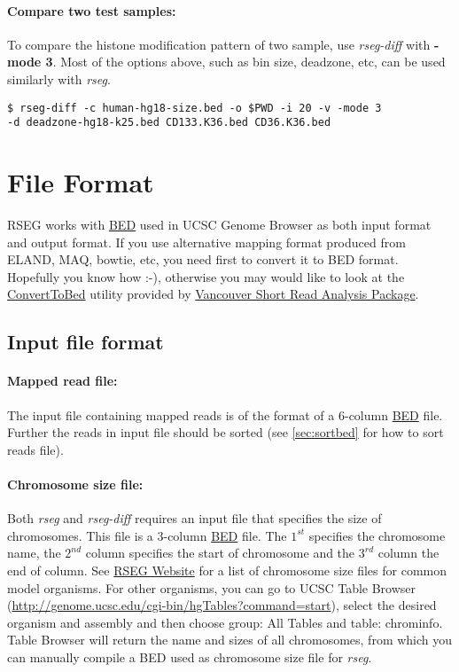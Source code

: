 \documentclass[11pt]{report}
\begin{document}
\paragraph{Compare two test samples:}
To compare the histone modification pattern of two sample, use
\textit{rseg-diff} with \textbf{-mode 3}. Most of the options above, such as bin size,
deadzone, etc, can be used similarly with \textit{rseg}.
\begin{verbatim}
$ rseg-diff -c human-hg18-size.bed -o $PWD -i 20 -v -mode 3 
-d deadzone-hg18-k25.bed CD133.K36.bed CD36.K36.bed
\end{verbatim}

\section{File Format}
\label{sec:file-format}

RSEG works with
\href{http://genome.ucsc.edu/FAQ/FAQformat.html#format1}{BED} used in
UCSC Genome Browser as both input format and output format. If you use
alternative mapping format produced from ELAND, MAQ, bowtie, etc, you
need first to convert it to BED format. Hopefully you know how :-),
otherwise you may would like to look at the
\href{http://sourceforge.net/apps/mediawiki/vancouvershortr/index.php?title=ConvertToBed}
{ConvertToBed} utility provided by
\href{http://sourceforge.net/projects/vancouvershortr/}{Vancouver
  Short Read Analysis Package}.


\subsection{Input file format}
\label{sec:input-file}

\paragraph{Mapped read file:} The input file containing mapped reads
is of the format of a 6-column
\href{http://genome.ucsc.edu/FAQ/FAQformat.html#format1}{BED}
file. Further the reads in input file should be sorted (see
\ref{sec:sortbed} for how to sort reads file).

\paragraph{Chromosome size file:} Both \textit{rseg} and
\textit{rseg-diff} requires an input file that specifies the size of
chromosomes. This file is a 3-column
\href{http://genome.ucsc.edu/FAQ/FAQformat.html#format1}{BED}
file. The $1^{st}$ specifies the chromosome name, the $2^{nd}$ column
specifies the start of chromosome and the $3^{rd}$ column the end of
column. See \href{http://smithlab.cmb.usc.edu/histone/software/}{RSEG
  Website} for a list of chromosome size files for common model
organisms. For other organisms, you can go to UCSC Table Browser
(\url{http://genome.ucsc.edu/cgi-bin/hgTables?command=start}), select
the desired organism and assembly and then choose group: All Tables
and table: chrominfo. Table Browser will return the name and sizes of
all chromosomes, from which you can manually compile a BED used as
chromosome size file for \textit{rseg}.
\end{document}
